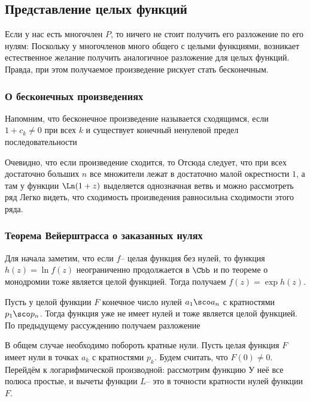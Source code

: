 \documentclass[a4paper]{article}
\begin{document}
\subsection{Представление целых функций}

Если у нас есть многочлен $P$, то ничего не стоит получить его разложение по его нулям:
Поскольку у многочленов много общего с целыми функциями, возникает естественное желание
получить аналогичное разложение
для целых функций. Правда, при этом получаемое произведение рискует стать бесконечным.

\subsubsection{О бесконечных произведениях}

Напомним, что бесконечное произведение
называется сходящимся, если $1 + c_k \neq 0$ при всех $k$ и существует конечный ненулевой предел
последовательности

Очевидно, что если произведение сходится, то
Отсюда следует, что при всех  достаточно больших $n$ все множители лежат в достаточно малой
окрестности $1$, а там у функции $\Ln(1+z)$ выделяется однозначная ветвь и можно рассмотреть
ряд
Легко видеть, что сходимость произведения равносильна сходимости этого ряда.

\subsubsection{Теорема Вейерштрасса о заказанных нулях}

Для начала заметим, что если $f$-- целая функция без нулей, то функция $h(z) = \ln f(z)$ неограниченно
продолжается в $\Cbb$ и по теореме о монодромии тоже является целой функцией. Тогда
получаем $f(z) = \exp h(z)$.

Пусть у целой функции $F$ конечное число нулей $a_1\sco a_n$ с кратностями $p_1\sco p_n$. Тогда функция
уже не имеет нулей и тоже является целой функцией. По предыдущему рассуждению получаем разложение

В общем случае необходимо побороть кратные нули. Пусть целая функция $F$ имеет нули
в точках $a_k$ с кратностями $p_k$. Будем считать, что $F(0) \neq 0$.
Перейдём к логарифмической производной: рассмотрим функцию
У неё все полюса простые, и вычеты функции $L$-- это в точности кратности нулей функции $F$.
\end{document}
